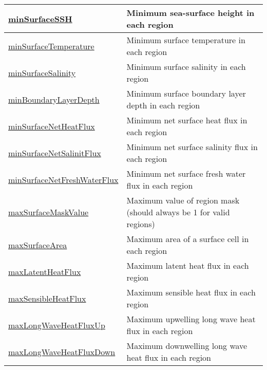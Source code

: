 {\begin{center}
\begin{longtable}{| p{2.0in} | p{4.0in} |}
    \hline
    \hyperref[subsec:var_sec_surfaceAreaWeightedAveragesAM_minSurfaceSSH]{minSurfaceSSH} & Minimum sea-surface height in each region \\
    \hline
    \hyperref[subsec:var_sec_surfaceAreaWeightedAveragesAM_minSurfaceTemperature]{minSurfaceTemperature} & Minimum surface temperature in each region \\
    \hline
    \hyperref[subsec:var_sec_surfaceAreaWeightedAveragesAM_minSurfaceSalinity]{minSurfaceSalinity} & Minimum surface salinity in each region \\
    \hline
    \hyperref[subsec:var_sec_surfaceAreaWeightedAveragesAM_minBoundaryLayerDepth]{minBoundaryLayerDepth} & Minimum surface boundary layer depth in each region \\
    \hline
    \hyperref[subsec:var_sec_surfaceAreaWeightedAveragesAM_minSurfaceNetHeatFlux]{minSurfaceNetHeatFlux} & Minimum net surface heat flux in each region \\
    \hline
    \hyperref[subsec:var_sec_surfaceAreaWeightedAveragesAM_minSurfaceNetSalinitFlux]{minSurfaceNetSalinitFlux} & Minimum net surface salinity flux in each region \\
    \hline
    \hyperref[subsec:var_sec_surfaceAreaWeightedAveragesAM_minSurfaceNetFreshWaterFlux]{minSurfaceNetFreshWaterFlux} & Minimum net surface fresh water flux in each region \\
    \hline
    \hyperref[subsec:var_sec_surfaceAreaWeightedAveragesAM_maxSurfaceMaskValue]{maxSurfaceMaskValue} & Maximum value of region mask (should always be 1 for valid regions) \\
    \hline
    \hyperref[subsec:var_sec_surfaceAreaWeightedAveragesAM_maxSurfaceArea]{maxSurfaceArea} & Maximum area of a surface cell in each region \\
    \hline
    \hyperref[subsec:var_sec_surfaceAreaWeightedAveragesAM_maxLatentHeatFlux]{maxLatentHeatFlux} & Maximum latent heat flux in each region \\
    \hline
    \hyperref[subsec:var_sec_surfaceAreaWeightedAveragesAM_maxSensibleHeatFlux]{maxSensibleHeatFlux} & Maximum sensible heat flux in each region \\
    \hline
    \hyperref[subsec:var_sec_surfaceAreaWeightedAveragesAM_maxLongWaveHeatFluxUp]{maxLongWaveHeatFluxUp} & Maximum upwelling long wave heat flux in each region \\
    \hline
    \hyperref[subsec:var_sec_surfaceAreaWeightedAveragesAM_maxLongWaveHeatFluxDown]{maxLongWaveHeatFluxDown} & Maximum downwelling long wave heat flux in each region \\

\end{longtable}
\end{center}}
